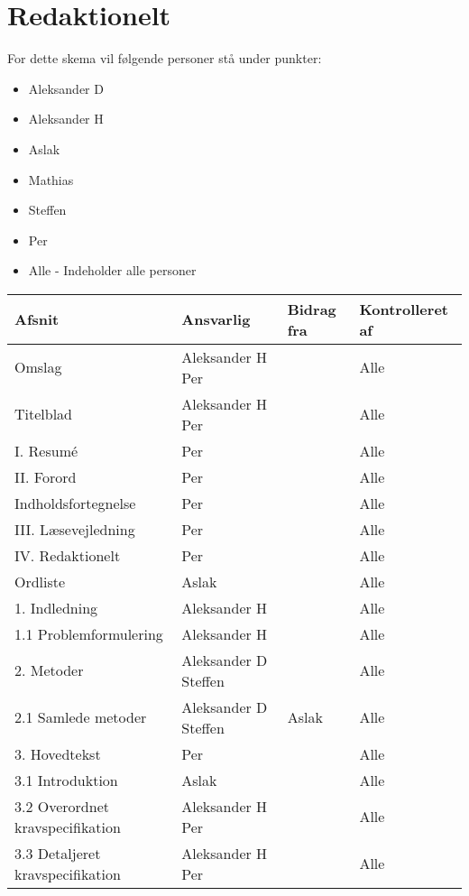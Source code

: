 \chapter{Redaktionelt}
For dette skema vil følgende personer stå under punkter: 
\begin{itemize}
\item Aleksander D
\item Aleksander H
\item Aslak
\item Mathias
\item Steffen
\item Per
\item Alle - Indeholder alle personer 
\end{itemize}

\begin{center}
\begin{longtable}{|m{5.8cm}|m{3.5cm}|m{3.5cm}|m{3.2cm}|}
\hline
\textbf{Afsnit} & \textbf{Ansvarlig} & \textbf{Bidrag fra} & \textbf{Kontrolleret af} \\
\hline
Omslag & Aleksander H \newline Per & & Alle\\
\hline
Titelblad & Aleksander H \newline Per & & Alle\\
\hline
I. Resumé & Per & & Alle\\ \hline
II. Forord & Per & & Alle\\ \hline
Indholdsfortegnelse & Per & & Alle\\ \hline
III. Læsevejledning & Per & & Alle\\ \hline

IV. Redaktionelt & Per & & Alle\\ \hline
Ordliste & Aslak & & Alle\\ \hline

1. Indledning & Aleksander H & & Alle\\ \hline
1.1 Problemformulering & Aleksander H & & Alle\\ \hline

2. Metoder & Aleksander D \newline Steffen & & Alle\\ \hline
2.1 Samlede metoder & Aleksander D \newline Steffen & Aslak & Alle\\ \hline

3. Hovedtekst & Per & & Alle\\ \hline
3.1 Introduktion & Aslak & & Alle\\ \hline
3.2 Overordnet kravspecifikation & Aleksander H \newline Per& & Alle\\ \hline
3.3 Detaljeret kravspecifikation & Aleksander H \newline Per& & Alle\\ \hline


\end{longtable}
\end{center}
